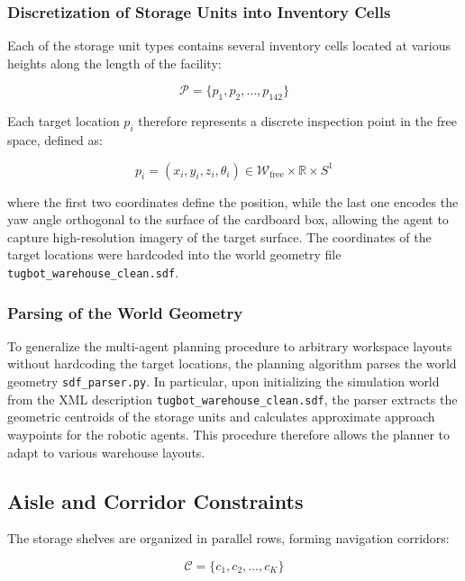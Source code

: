 \subsubsection{Discretization of Storage Units into Inventory Cells}

Each of the storage unit types contains several inventory cells located at various heights along the length of the facility:

\begin{equation}
\mathcal{P} = \{ p_1, p_2, \dots, p_{142} \}
\end{equation}

Each target location $p_i$ therefore represents a discrete inspection point in the free space, defined as:

\begin{equation}
p_i = (x_i, y_i, z_i, \theta_i) \in \mathcal{W}_{\text{free}} \times \mathbb{R} \times S^1
\end{equation}

where the first two coordinates define the position, while the last one encodes the yaw angle orthogonal to the surface of the cardboard box, allowing the agent to capture high-resolution imagery of the target surface. The coordinates of the target locations were hardcoded into the world geometry file \texttt{tugbot\_warehouse\_clean.sdf}.

\subsubsection{Parsing of the World Geometry}

To generalize the multi-agent planning procedure to arbitrary workspace layouts without hardcoding the target locations, the planning algorithm parses the world geometry \texttt{sdf\_parser.py}. In particular, upon initializing the simulation world from the XML description \texttt{tugbot\_warehouse\_clean.sdf}, the parser extracts the geometric centroids of the storage units and calculates approximate approach waypoints for the robotic agents. This procedure therefore allows the planner to adapt to various warehouse layouts.

\subsection{Aisle and Corridor Constraints}

The storage shelves are organized in parallel rows, forming navigation corridors:

\begin{equation}
\mathcal{C} = \{ c_1, c_2, \dots, c_K \}
\end{equation}


